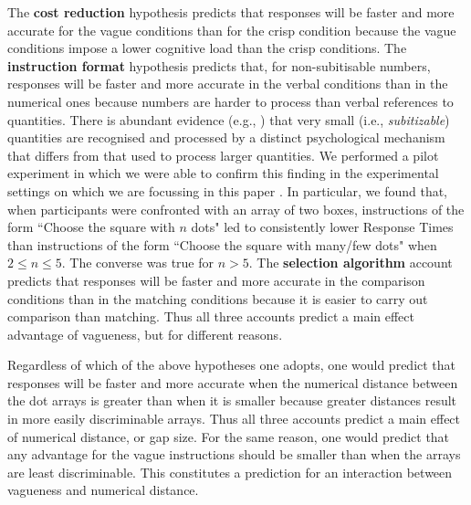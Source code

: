 \documentclass[doc,apacite]{apa6}
\begin{document}
The {\bf cost reduction} hypothesis predicts that responses will be faster and more accurate for the vague conditions than for the crisp condition because the vague conditions impose a lower cognitive load than the crisp conditions.  The {\bf instruction format} hypothesis predicts that, for non-subitisable numbers, responses will be faster and more accurate in the verbal conditions than in the numerical ones because numbers are harder to process than verbal references to quantities. There is abundant evidence (e.g., \protect\cite{trick1994small}) that very small (i.e., \emph{subitizable}) quantities are recognised and processed by a distinct psychological mechanism that differs from that used to process larger quantities. We performed a pilot experiment in which we were able to confirm this finding in the experimental settings on which we are focussing in this paper \cite{our-earlier-paper}. In particular, we found that, when participants were confronted with an array of two boxes, instructions of the form ``Choose the square with $n$ dots" led to consistently lower Response Times than instructions of the form ``Choose the square with many/few dots" when $2 \leq n \leq 5$. The converse was true for $n>5$. %
The {\bf selection algorithm} account predicts that responses will be faster and more accurate in the comparison conditions than in the matching conditions because it is easier to carry out comparison than matching. Thus all three accounts predict a main effect advantage of vagueness, but for different reasons.

Regardless of which of the above hypotheses one adopts, one would predict that responses will be faster and more accurate when the numerical distance between the dot arrays is greater than when it is smaller because greater distances result in more easily discriminable arrays. Thus all three accounts predict a main effect of numerical distance, or gap size. For the same reason, one would predict that any advantage for the vague instructions should be smaller than when the arrays are least discriminable. This constitutes a prediction for an interaction between vagueness and numerical distance. %
\end{document}
